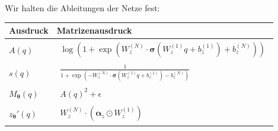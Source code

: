 \documentclass[a4paper, 12pt]{scrartcl}
\begin{document}
Wir halten die Ableitungen der Netze fest:

\begin{center}
    \begin{tabular}{ll}
        Ausdruck 
        &
        Matrizenausdruck
        \\[0.5em] \hline
        \noalign{\vspace{0.5em}}
        $A(q)$
        &
        $\begin{aligned}
            \log
            \left(
                1 + 
                \exp
                \left(
                    W^{(N)}_z \cdot 
                    \bm{\sigma}
                    \left(
                        W^{(1)}_z q + b_z^{(1)}
                    \right) 
                    + b_z^{(N)}
                \right)
            \right)
        \end{aligned}$
        \\[0.5em] \hline
        \noalign{\vspace{0.5em}}
        $s(q)$
        &
        $\begin{aligned}
            \frac{1}{
                1 
                + 
                \exp
                \left(
                    - W^{(N)}_z \cdot \bm{\sigma}
                    \left(
                        W^{(1)}_z q 
                        +
                        b_z^{(1)}
                    \right) 
                    - b_z^{(N)}
                \right)}
        \end{aligned}$
        \\[0.5em] \hline
        \noalign{\vspace{0.5em}}
        $M_{\bm{\theta}}(q)$
        &
        $\begin{aligned}
            A(q)^2
            + \epsilon
        \end{aligned}$
        \\[0.5em] \hline
        \noalign{\vspace{0.5em}}
        $z_{\bm{\theta}}'(q)$
        &
        $\begin{aligned}
            W_z^{(N)}
            \cdot
            \left(\bm{\alpha}_z \odot W_z^{(1)}\right)
        \end{aligned}$ 

\end{tabular}
\end{center}
\end{document}
